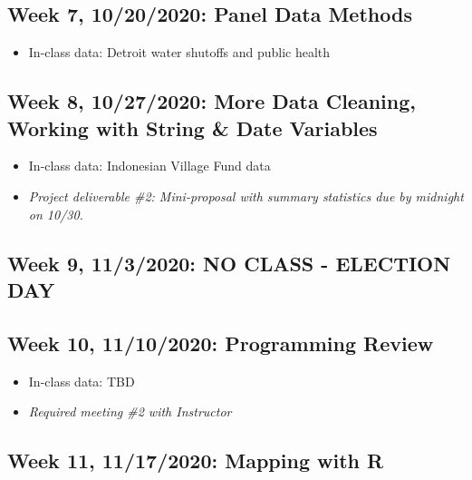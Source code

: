 \documentclass[11pt,]{article}
\providecommand{\tightlist}{%
  \setlength{\itemsep}{0pt}\setlength{\parskip}{0pt}}
\begin{document}
\hypertarget{week-7-10202020-panel-data-methods}{%
\subsection{Week 7, 10/20/2020: Panel Data
Methods}\label{week-7-10202020-panel-data-methods}}

\begin{itemize}
\tightlist
\item
  In-class data: Detroit water shutoffs and public health \medskip
\end{itemize}

\hypertarget{week-8-10272020-more-data-cleaning-working-with-string-date-variables}{%
\subsection{Week 8, 10/27/2020: More Data Cleaning, Working with String
\& Date
Variables}\label{week-8-10272020-more-data-cleaning-working-with-string-date-variables}}

\begin{itemize}
\tightlist
\item
  In-class data: Indonesian Village Fund data
\item
  \emph{Project deliverable \#2: Mini-proposal with summary statistics
  due by midnight on 10/30.} \medskip
\end{itemize}

\hypertarget{week-9-1132020-no-class---election-day}{%
\subsection{Week 9, 11/3/2020: NO CLASS - ELECTION
DAY}\label{week-9-1132020-no-class---election-day}}

\medskip

\hypertarget{week-10-11102020-programming-review}{%
\subsection{Week 10, 11/10/2020: Programming
Review}\label{week-10-11102020-programming-review}}

\begin{itemize}
\tightlist
\item
  In-class data: TBD
\item
  \emph{Required meeting \#2 with Instructor} \medskip
\end{itemize}

\hypertarget{week-11-11172020-mapping-with-r}{%
\subsection{Week 11, 11/17/2020: Mapping with
R}\label{week-11-11172020-mapping-with-r}}
\end{document}
